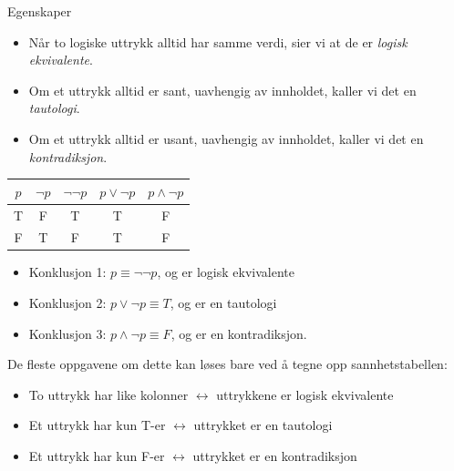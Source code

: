 \begin{frame}{Egenskaper}
    \begin{itemize}
        \item Når to logiske uttrykk alltid har samme verdi, sier vi at de er \emph{logisk ekvivalente}.
        \pause
        \item Om et uttrykk alltid er sant, uavhengig av innholdet, kaller vi det en \emph{tautologi}.
        \pause
        \item Om et uttrykk alltid er usant, uavhengig av innholdet, kaller vi det en \emph{kontradiksjon}.
    \end{itemize}
    \pause
    \begin{center}
        \begin{tabular}{c|c|c|c|c}
            $p$ & $\lnot p$ & $\lnot \lnot p$ & $p \lor \lnot p$ & $p \land \lnot p$\\ \hline
            T & F & T & T & F\\
            F & T & F & T & F
        \end{tabular}
    \end{center}
    \pause
    \begin{itemize}
        \item Konklusjon 1: $p \equiv \lnot \lnot p$, og er logisk ekvivalente
        \pause
        \item Konklusjon 2: $p \lor \lnot p \equiv T$, og er en tautologi
        \pause
        \item Konklusjon 3: $p \land \lnot p \equiv F$, og er en kontradiksjon.
    \end{itemize}
    \pause
    De fleste oppgavene om dette kan løses bare ved å tegne opp sannhetstabellen:
    \begin{itemize}
        \item To uttrykk har like kolonner $\leftrightarrow$ uttrykkene er logisk ekvivalente
        \pause
        \item Et uttrykk har kun T-er $\leftrightarrow$ uttrykket er en tautologi
        \pause
        \item Et uttrykk har kun F-er $\leftrightarrow$ uttrykket er en kontradiksjon
    \end{itemize}
\end{frame}

